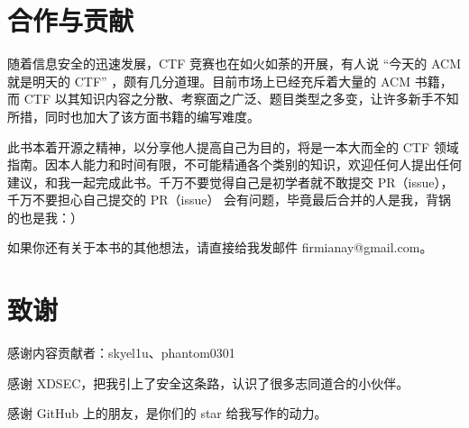 \section{合作与贡献}
\indent \setlength{\parindent}{2em}

    \indent 随着信息安全的迅速发展，CTF 竞赛也在如火如荼的开展，有人说 “今天的 ACM 就是明天的 CTF” ，颇有几分道理。目前市场上已经充斥着大量的 ACM 书籍，而 CTF 以其知识内容之分散、考察面之广泛、题目类型之多变，让许多新手不知所措，同时也加大了该方面书籍的编写难度。

    \indent 此书本着开源之精神，以分享他人提高自己为目的，将是一本大而全的 CTF 领域指南。因本人能力和时间有限，不可能精通各个类别的知识，欢迎任何人提出任何建议，和我一起完成此书。千万不要觉得自己是初学者就不敢提交 PR（issue），千万不要担心自己提交的 PR（issue） 会有问题，毕竟最后合并的人是我，背锅的也是我：）

    \indent 如果你还有关于本书的其他想法，请直接给我发邮件 firmianay@gmail.com。

\section{致谢}
\indent \setlength{\parindent}{2em}

\indent 感谢内容贡献者：skyel1u、phantom0301

\indent 感谢 XDSEC，把我引上了安全这条路，认识了很多志同道合的小伙伴。

\indent 感谢 GitHub 上的朋友，是你们的 star 给我写作的动力。
